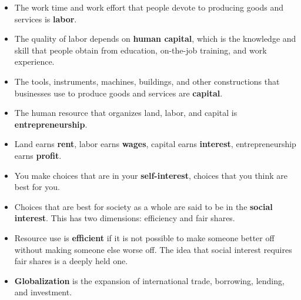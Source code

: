 \documentclass{article}
\begin{document}
\begin{description}
\begin{itemize}
        \item The work time and work effort that people devote to producing goods and services is \textbf{labor}.
        \item The quality of labor depends on \textbf{human capital}, which is the knowledge and skill that people obtain from education, on-the-job training, and work experience.
        \item The tools, instruments, machines, buildings, and other constructions that businesses use to produce goods and services are \textbf{capital}.
        \item The human resource that organizes land, labor, and capital is \textbf{entrepreneurship}.
        \item Land earns \textbf{rent}, labor earns \textbf{wages}, capital earns \textbf{interest}, entrepreneurship earns \textbf{profit}.
        \item You make choices that are in your \textbf{self-interest}, choices that you think are  best for you.
        \item Choices that are best for society as a whole are said to be in the \textbf{social interest}. This has two dimensions: efficiency and fair shares.
        \item Resource use is \textbf{efficient} if it is not possible to make someone better off without making someone else worse off. The idea that social interest requires fair shares is a deeply held one.
        \item \textbf{Globalization} is the expansion of international trade, borrowing, lending, and investment.
    \end{itemize}
\end{description}
\end{document}
